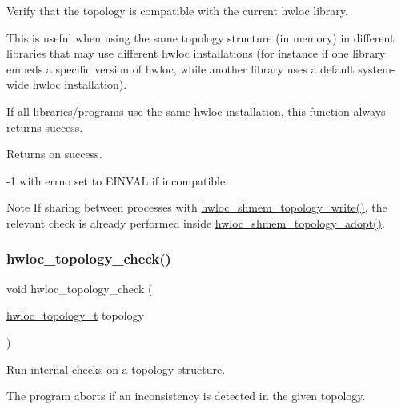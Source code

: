 Verify that the topology is compatible with the current hwloc library. 

This is useful when using the same topology structure (in memory) in different libraries that may use different hwloc installations (for instance if one library embeds a specific version of hwloc, while another library uses a default system-\/wide hwloc installation).

If all libraries/programs use the same hwloc installation, this function always returns success.

\begin{DoxyReturn}{Returns}
{} on success.

{\ttfamily -\/1} with {\ttfamily errno} set to {\ttfamily E\+I\+N\+V\+AL} if incompatible.
\end{DoxyReturn}
\begin{DoxyNote}{Note}
If sharing between processes with \hyperlink{a00226_ga61b20e346fc76f76420e3a88cc80a671}{hwloc\+\_\+shmem\+\_\+topology\+\_\+write()}, the relevant check is already performed inside \hyperlink{a00226_ga21545bd0f09d9b554c8e60a630e0e629}{hwloc\+\_\+shmem\+\_\+topology\+\_\+adopt()}. 
\end{DoxyNote}
\mbox{\label{a00186_gaf6746bc3a558ef1ac8348b4491d091b5}} 
\subsubsection{\texorpdfstring{hwloc\+\_\+topology\+\_\+check()}{hwloc\_topology\_check()}}
{\footnotesize\ttfamily void hwloc\+\_\+topology\+\_\+check (\begin{DoxyParamCaption}\item[{\hyperlink{a00186_ga9d1e76ee15a7dee158b786c30b6a6e38}{hwloc\+\_\+topology\+\_\+t}}]{topology }\end{DoxyParamCaption})}



Run internal checks on a topology structure. 

The program aborts if an inconsistency is detected in the given topology.


